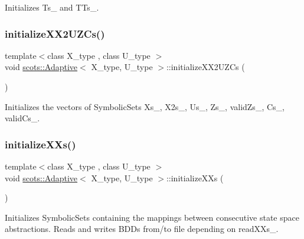 Initializes Ts\+\_\+ and T\+Ts\+\_\+. \mbox{\label{classscots_1_1Adaptive_ad7b09416eb224909dcfddcb6487b3b82}} 
\subsubsection{\texorpdfstring{initialize\+X\+X2\+U\+Z\+Cs()}{initializeXX2UZCs()}}
{\footnotesize\ttfamily template$<$class X\+\_\+type , class U\+\_\+type $>$ \\
void \hyperlink{classscots_1_1Adaptive}{scots\+::\+Adaptive}$<$ X\+\_\+type, U\+\_\+type $>$\+::initialize\+X\+X2\+U\+Z\+Cs (\begin{DoxyParamCaption}{ }\end{DoxyParamCaption})\hspace{0.3cm}{\ttfamily [inline]}}

Initializes the vectors of Symbolic\+Sets Xs\+\_\+, X2s\+\_\+, Us\+\_\+, Zs\+\_\+, valid\+Zs\+\_\+, Cs\+\_\+, valid\+Cs\+\_\+. \mbox{\label{classscots_1_1Adaptive_af08ee7fae4cf6c5ae1fcabb8699e0721}} 
\subsubsection{\texorpdfstring{initialize\+X\+Xs()}{initializeXXs()}}
{\footnotesize\ttfamily template$<$class X\+\_\+type , class U\+\_\+type $>$ \\
void \hyperlink{classscots_1_1Adaptive}{scots\+::\+Adaptive}$<$ X\+\_\+type, U\+\_\+type $>$\+::initialize\+X\+Xs (\begin{DoxyParamCaption}{ }\end{DoxyParamCaption})\hspace{0.3cm}{\ttfamily [inline]}}

Initializes Symbolic\+Sets containing the mappings between consecutive state space abstractions. Reads and writes B\+D\+Ds from/to file depending on read\+X\+Xs\+\_\+. \mbox{\label{classscots_1_1Adaptive_a01f8f69d290f9c81f76f6ab44d9ef193}} 
